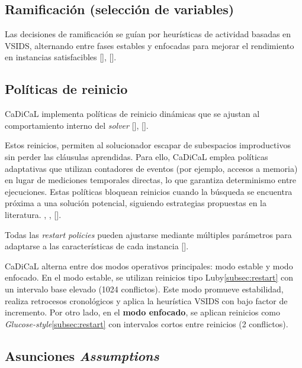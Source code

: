\subsection{Ramificaci\'on (selecci\'on de variables)}
Las decisiones de ramificación se guían por heurísticas de actividad basadas en VSIDS, alternando entre fases estables y enfocadas para mejorar el rendimiento en instancias satisfacibles [\cite{iser2021unit}], [\cite{cherif2021combining}].


\subsection{Políticas de reinicio}
\label{subsec:cadical-restart}

CaDiCaL implementa políticas de reinicio dinámicas que se ajustan al comportamiento interno del \textit{solver} [\cite{biere2019restart_schemes}], [\cite{zhang2024revisiting}].

Estos reinicios, permiten al solucionador escapar de subespacios improductivos sin perder las cláusulas aprendidas. Para ello, CaDiCaL emplea políticas adaptativas que utilizan contadores de eventos (por ejemplo, accesos a memoria) en lugar de mediciones temporales directas, lo que garantiza determinismo entre ejecuciones. Estas políticas bloquean reinicios cuando la búsqueda se encuentra próxima a una solución potencial, siguiendo estrategias propuestas en la literatura. \cite{cherif2021combining}, \cite{biere2019restart_schemes}, [\cite{zhang2024revisiting}].


Todas las \textit{restart policies} pueden ajustarse mediante múltiples parámetros para adaptarse a las características de cada instancia [\cite{cai2022better_heuristics}].

CaDiCaL alterna entre dos modos operativos principales: modo estable y modo enfocado. En el modo estable, se utilizan reinicios tipo Luby\ref{subsec:restart} con un intervalo base elevado (1024 conflictos). Este modo promueve estabilidad, realiza retrocesos cronológicos y aplica la heurística VSIDS con bajo factor de incremento. Por otro lado, en el \textbf{modo enfocado}, se aplican reinicios como \textit{Glucose-style}\ref{subsec:restart} con intervalos cortos entre reinicios (2 conflictos).

\subsection{Asunciones \textit{Assumptions}}
\label{subsec:cadical-assumptions}

